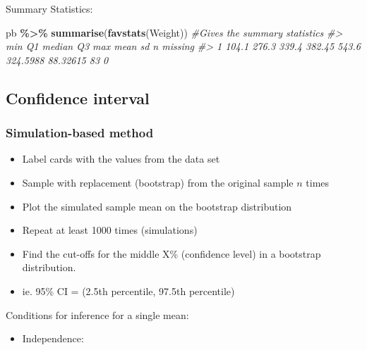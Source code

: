 \documentclass[
]{report}
\newenvironment{Shaded}{\begin{snugshade}}{\end{snugshade}}
\newcommand{\AttributeTok}[1]{\textcolor[rgb]{0.13,0.29,0.53}{#1}}
\newcommand{\CommentTok}[1]{\textcolor[rgb]{0.56,0.35,0.01}{\textit{#1}}}
\newcommand{\DecValTok}[1]{\textcolor[rgb]{0.00,0.00,0.81}{#1}}
\newcommand{\FloatTok}[1]{\textcolor[rgb]{0.00,0.00,0.81}{#1}}
\newcommand{\FunctionTok}[1]{\textcolor[rgb]{0.13,0.29,0.53}{\textbf{#1}}}
\newcommand{\NormalTok}[1]{#1}
\newcommand{\SpecialCharTok}[1]{\textcolor[rgb]{0.81,0.36,0.00}{\textbf{#1}}}
\newcommand{\StringTok}[1]{\textcolor[rgb]{0.31,0.60,0.02}{#1}}
\providecommand{\tightlist}{%
  \setlength{\itemsep}{0pt}\setlength{\parskip}{0pt}}
\begin{document}
Summary Statistics:

\begin{Shaded}
\begin{Highlighting}[]
\NormalTok{pb }\SpecialCharTok{\%\textgreater{}\%}
  \FunctionTok{summarise}\NormalTok{(}\FunctionTok{favstats}\NormalTok{(Weight)) }\CommentTok{\#Gives the summary statistics}
\CommentTok{\#\textgreater{}     min    Q1 median     Q3   max     mean       sd  n missing}
\CommentTok{\#\textgreater{} 1 104.1 276.3  339.4 382.45 543.6 324.5988 88.32615 83       0}
\end{Highlighting}
\end{Shaded}

\subsection*{Confidence interval}\label{confidence-interval}

\subsubsection*{Simulation-based method}\label{simulation-based-method-3}

\begin{itemize}
\item
  Label cards with the values from the data set
\item
  Sample with replacement (bootstrap) from the original sample \(n\) times
\item
  Plot the simulated sample mean on the bootstrap distribution
\item
  Repeat at least 1000 times (simulations)
\item
  Find the cut-offs for the middle X\% (confidence level) in a bootstrap distribution.
\item
  ie. 95\% CI = (2.5th percentile, 97.5th percentile)
\end{itemize}

Conditions for inference for a single mean:

\begin{itemize}
\tightlist
\item
  Independence:
\end{itemize}

\vspace{0.5in}

\begin{Shaded}
\end{Shaded}
\end{document}
